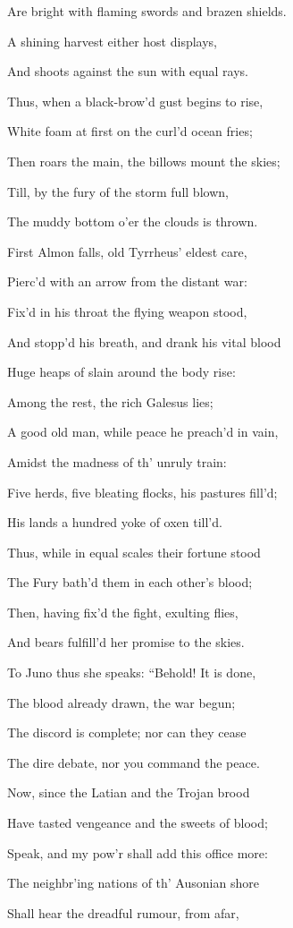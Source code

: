 Are bright with flaming swords and brazen shields.

A shining harvest either host displays,

And shoots against the sun with equal rays.

Thus, when a black-brow’d gust begins to rise,

White foam at first on the curl’d ocean fries;

Then roars the main, the billows mount the skies;

Till, by the fury of the storm full blown,

The muddy bottom o’er the clouds is thrown.

First Almon falls, old Tyrrheus’ eldest care,

Pierc’d with an arrow from the distant war:

Fix’d in his throat the flying weapon stood,

And stopp’d his breath, and drank his vital blood

Huge heaps of slain around the body rise:

Among the rest, the rich Galesus lies;

A good old man, while peace he preach’d in vain,

Amidst the madness of th’ unruly train:

Five herds, five bleating flocks, his pastures fill’d;

His lands a hundred yoke of oxen till’d.

Thus, while in equal scales their fortune stood

The Fury bath’d them in each other’s blood;

Then, having fix’d the fight, exulting flies,

And bears fulfill’d her promise to the skies.

To Juno thus she speaks: “Behold! It is done,

The blood already drawn, the war begun;

The discord is complete; nor can they cease

The dire debate, nor you command the peace.

Now, since the Latian and the Trojan brood

Have tasted vengeance and the sweets of blood;

Speak, and my pow’r shall add this office more:

The neighbr’ing nations of th’ Ausonian shore

Shall hear the dreadful rumour, from afar,

